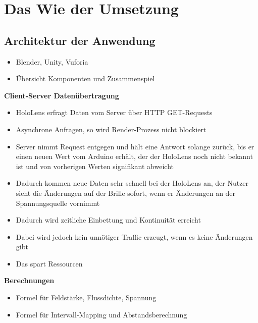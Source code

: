 \section{Das Wie der Umsetzung}
\label{sec-5}
\subsection{Architektur der Anwendung}
\begin{itemize}
	\item Blender, Unity, Vuforia
	\item Übersicht Komponenten und Zusammenspiel
\end{itemize}

\textbf{Client-Server Datenübertragung}
\begin{itemize}
	\item HoloLens erfragt Daten vom Server über HTTP GET-Requests
	\item Asynchrone Anfragen, so wird Render-Prozess nicht blockiert
	\item Server nimmt Request entgegen und hält eine Antwort solange zurück, bis er einen neuen Wert vom Arduino erhält, der der HoloLens noch nicht bekannt ist und von vorherigen Werten signifikant abweicht
	\item Dadurch kommen neue Daten sehr schnell bei der HoloLens an, der Nutzer sieht die Änderungen auf der Brille sofort, wenn er Änderungen an der Spannungsquelle vornimmt
	\item Dadurch wird zeitliche Einbettung und Kontinuität erreicht
	\item Dabei wird jedoch kein unnötiger Traffic erzeugt, wenn es keine Änderungen gibt
	\item Das spart Ressourcen
\end{itemize}

\textbf{Berechnungen}
\begin{itemize}
	\item Formel für Feldstärke, Flussdichte, Spannung
	\item Formel für Intervall-Mapping und Abstandsberechnung
\end{itemize}


